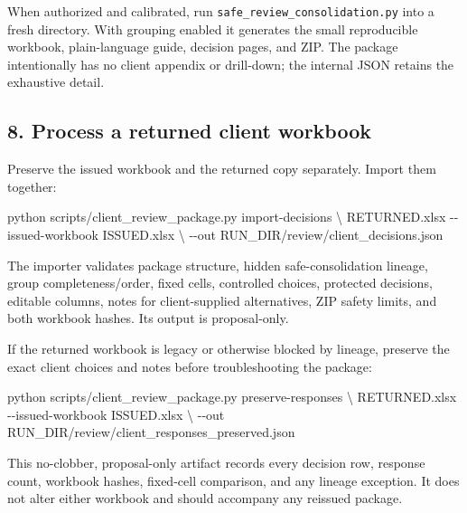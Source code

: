 \documentclass[
]{article}
\newenvironment{Shaded}{}{}
\newcommand{\AttributeTok}[1]{\textcolor[rgb]{0.49,0.56,0.16}{#1}}
\newcommand{\DataTypeTok}[1]{\textcolor[rgb]{0.56,0.13,0.00}{#1}}
\newcommand{\ExtensionTok}[1]{#1}
\newcommand{\NormalTok}[1]{#1}
\begin{document}
When authorized and calibrated, run
\texttt{safe\_\allowbreak{}review\_\allowbreak{}consolidation.py} into a
fresh directory. With grouping enabled it generates the small
reproducible workbook, plain-language guide, decision pages, and ZIP.
The package intentionally has no client appendix or drill-down; the
internal JSON retains the exhaustive detail.

\subsection{8. Process a returned client
workbook}\label{process-a-returned-client-workbook}

Preserve the issued workbook and the returned copy separately. Import
them together:

\begin{Shaded}
\begin{Highlighting}[]
\ExtensionTok{python}\NormalTok{ scripts/client\_review\_package.py import{-}decisions }\DataTypeTok{\textbackslash{}}
\NormalTok{  RETURNED.xlsx }\AttributeTok{{-}{-}issued{-}workbook}\NormalTok{ ISSUED.xlsx }\DataTypeTok{\textbackslash{}}
  \AttributeTok{{-}{-}out}\NormalTok{ RUN\_DIR/review/client\_decisions.json}
\end{Highlighting}
\end{Shaded}

The importer validates package structure, hidden safe-consolidation
lineage, group completeness/order, fixed cells, controlled choices,
protected decisions, editable columns, notes for client-supplied
alternatives, ZIP safety limits, and both workbook hashes. Its output is
proposal-only.

If the returned workbook is legacy or otherwise blocked by lineage,
preserve the exact client choices and notes before troubleshooting the
package:

\begin{Shaded}
\begin{Highlighting}[]
\ExtensionTok{python}\NormalTok{ scripts/client\_review\_package.py preserve{-}responses }\DataTypeTok{\textbackslash{}}
\NormalTok{  RETURNED.xlsx }\AttributeTok{{-}{-}issued{-}workbook}\NormalTok{ ISSUED.xlsx }\DataTypeTok{\textbackslash{}}
  \AttributeTok{{-}{-}out}\NormalTok{ RUN\_DIR/review/client\_responses\_preserved.json}
\end{Highlighting}
\end{Shaded}

This no-clobber, proposal-only artifact records every decision row,
response count, workbook hashes, fixed-cell comparison, and any lineage
exception. It does not alter either workbook and should accompany any
reissued package.
\end{document}
